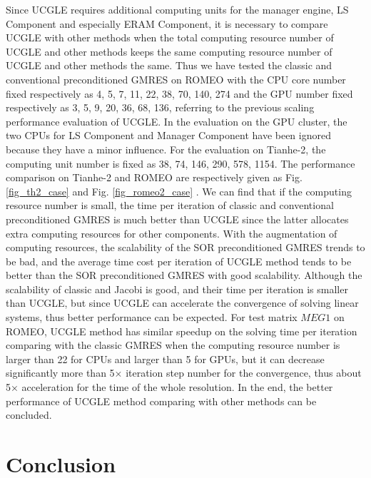 Since UCGLE requires additional computing units for the manager engine, LS Component and especially ERAM Component, it is necessary to compare UCGLE with other methods when the total computing resource number of UCGLE and other methods keeps the same computing resource number of UCGLE and other methods the same. Thus we have tested the classic and conventional preconditioned GMRES on ROMEO with the CPU core number fixed respectively as 4, 5, 7, 11, 22, 38, 70, 140, 274 and the GPU number fixed respectively as 3, 5, 9, 20, 36, 68, 136, referring to the previous scaling performance evaluation of UCGLE. In the evaluation on the GPU cluster, the two CPUs for LS Component and Manager Component have been ignored because they have a minor influence. For the evaluation on Tianhe-2, the computing unit number is fixed as 38, 74, 146, 290, 578, 1154. The performance comparison on Tianhe-2 and ROMEO are respectively given as Fig. \ref{fig_th2_case} and Fig. \ref{fig_romeo2_case} . We can find that if the computing resource number is small, the time per iteration of classic and conventional preconditioned GMRES is much better than UCGLE since the latter allocates extra computing resources for other components. With the augmentation of computing resources, the scalability of the SOR preconditioned GMRES trends to be bad, and the average time cost per iteration of UCGLE method tends to be better than the SOR preconditioned GMRES with good scalability. Although the scalability of classic and Jacobi is good, and their time per iteration is smaller than UCGLE, but since UCGLE can accelerate the convergence of solving linear systems, thus better performance can be expected. For test matrix $MEG1$ on ROMEO, UCGLE method has similar speedup on the solving time per iteration comparing with the classic GMRES when the computing resource number is larger than 22 for CPUs and larger than 5 for GPUs, but it can decrease significantly more than 5× iteration step number for the convergence, thus about 5× acceleration for the time of the whole resolution. In the end, the better performance of UCGLE method comparing with other methods can be concluded.

\section{Conclusion}

